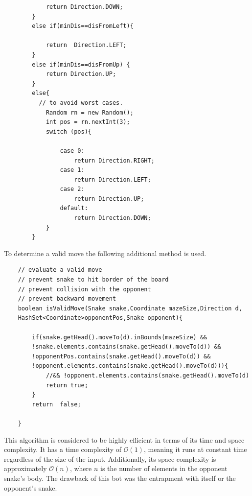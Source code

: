 \documentclass[a4paper,12pt]{article}
\begin{document}
\begin{verbatim}
            return Direction.DOWN;
        }
        else if(minDis==disFromLeft){

            return  Direction.LEFT;
        }
        else if(minDis==disFromUp) {
            return Direction.UP;
        }
        else{
          // to avoid worst cases.
            Random rn = new Random();
            int pos = rn.nextInt(3);
            switch (pos){

                case 0:
                    return Direction.RIGHT;
                case 1:
                    return Direction.LEFT;
                case 2:
                    return Direction.UP;
                default:
                    return Direction.DOWN;
            }
        }

\end{verbatim}
To determine a valid move the following additional method is used.
\begin{verbatim}
    // evaluate a valid move
    // prevent snake to hit border of the board
    // prevent collision with the opponent
    // prevent backward movement
    boolean isValidMove(Snake snake,Coordinate mazeSize,Direction d,
	HashSet<Coordinate>opponentPos,Snake opponent){

        if(snake.getHead().moveTo(d).inBounds(mazeSize) && 
		!snake.elements.contains(snake.getHead().moveTo(d)) && 
        !opponentPos.contains(snake.getHead().moveTo(d)) && 
		!opponent.elements.contains(snake.getHead().moveTo(d))){
            //&& !opponent.elements.contains(snake.getHead().moveTo(d)
            return true;
        }
        return  false;

    }
\end{verbatim}
This algorithm is considered to be highly efficient in terms of its time and space complexity. 
It has a time complexity of $\mathcal{O}(1)$, meaning it runs at constant time regardless of the size of the input. 
Additionally, its space complexity is approximately $\mathcal{O}(n)$, where $n$ is the number of elements in the opponent snake's body.
The drawback of this bot was the entrapment with itself or the opponent's snake.
\end{document}
